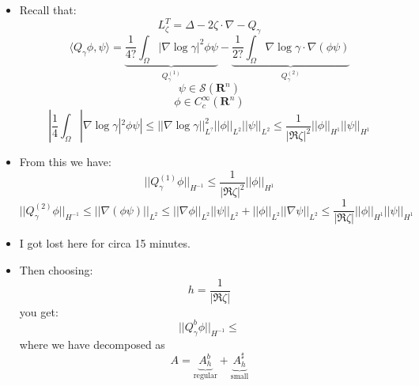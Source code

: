 \documentclass{article}
\begin{document}
\begin{itemize}
    \item Recall that:
    \begin{equation}
        L_\zeta^T =  \Delta - 2 \zeta \cdot \nabla - Q_\gamma
    \end{equation}
    \begin{equation}
        \langle Q_\gamma \phi, \psi \rangle = \underbrace{\frac{1}{4?}\int_\Omega |\nabla \log \gamma|^2 \phi \psi}_{Q^{(1)}_\gamma} - \underbrace{\frac{1}{2?} \int_\Omega \nabla \log \gamma \cdot \nabla (\phi \psi)}_{Q^{(2)}_\gamma}
    \end{equation}
    \begin{equation}
        \psi \in \mathcal{S}(\mathbf{R}^n)
    \end{equation}
    \begin{equation}
        \phi \in C_c^\infty(\mathbf{R}^n)
    \end{equation}
    \begin{equation}
        |\frac{1}{4}\int_\Omega |\nabla \log \gamma|^2 \phi \psi | \leq ||\nabla \log \gamma||^2_{L^?} ||\phi||_{L^2} ||\psi||_{L^2} \leq \frac{1}{| \Re \zeta |^2} ||\phi||_{H^1}||\psi||_{H^1}
    \end{equation}

    \item From this we have:
    \begin{equation}
        ||Q^{(1)}_\gamma \phi||_{H^{-1}} \leq \frac{1}{| \Re \zeta |^2} ||\phi||_{H^1}
    \end{equation}
    \begin{equation}
        ||Q^{(2)}_\gamma \phi||_{H^{-1}} \leq || \nabla (\phi \psi)||_{L^2} \leq || \nabla \phi||_{L^2} || \psi||_{L^2} + || \phi||_{L^2}|| \nabla \psi||_{L^2} \leq \frac{1}{| \Re \zeta |} || \phi ||_{H^1} || \psi ||_{H^1} 
    \end{equation}

    \item I got lost here for circa 15 minutes.

    \item Then choosing:
    \begin{equation}
        h = \frac{1}{|\Re \zeta |}
    \end{equation}
    you get:
    \begin{equation}
        || Q_\gamma^b \phi||_{H^{-1}}  \leq
    \end{equation}
    where we have decomposed as
    \begin{equation}
        A = \underbrace{A_h^b}_{\text{regular}} + \underbrace{A_h^{\sharp}}_{\text{small}}
    \end{equation}


\end{itemize}
\end{document}
